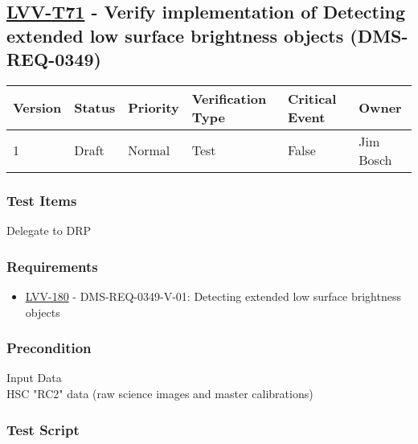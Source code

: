 \hypertarget{lvv-t71---verify-implementation-of-detecting-extended-low-surface-brightness-objects-dms-req-0349}{%
\subsection{\texorpdfstring{\href{https://jira.lsstcorp.org/secure/Tests.jspa\#/testCase/LVV-T71}{LVV-T71}
- Verify implementation of Detecting extended low surface brightness
objects
(DMS-REQ-0349)}{LVV-T71 - Verify implementation of Detecting extended low surface brightness objects (DMS-REQ-0349)}}\label{lvv-t71---verify-implementation-of-detecting-extended-low-surface-brightness-objects-dms-req-0349}}

\begin{longtable}[]{@{}llllll@{}}
\toprule
Version & Status & Priority & Verification Type & Critical Event &
Owner\tabularnewline
\midrule
\endhead
1 & Draft & Normal & Test & False & Jim Bosch\tabularnewline
\bottomrule
\end{longtable}

\hypertarget{test-items-47}{%
\subsubsection{Test Items}\label{test-items-47}}

Delegate to DRP

\hypertarget{requirements-48}{%
\subsubsection{Requirements}\label{requirements-48}}

\begin{itemize}
\tightlist
\item
  \href{https://jira.lsstcorp.org/browse/LVV-180}{LVV-180} -
  DMS-REQ-0349-V-01: Detecting extended low surface brightness objects
\end{itemize}

\hypertarget{precondition-5}{%
\subsubsection{Precondition}\label{precondition-5}}

Input Data\\
HSC "RC2" data (raw science images and master calibrations)

\hypertarget{test-script-48}{%
\subsubsection{Test Script}\label{test-script-48}}

